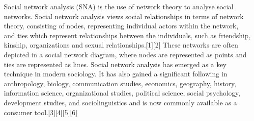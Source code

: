 Social network analysis (SNA) is the use of network theory to analyse social networks. Social network analysis views social relationships in terms of network theory, consisting of nodes, representing individual actors within the network, and ties which represent relationships between the individuals, such as friendship, kinship, organizations and sexual relationships.[1][2] These networks are often depicted in a social network diagram, where nodes are represented as points and ties are represented as lines.
Social network analysis has emerged as a key technique in modern sociology. It has also gained a significant following in anthropology, biology, communication studies, economics, geography, history, information science, organizational studies, political science, social psychology, development studies, and sociolinguistics and is now commonly available as a consumer tool.[3][4][5][6]
